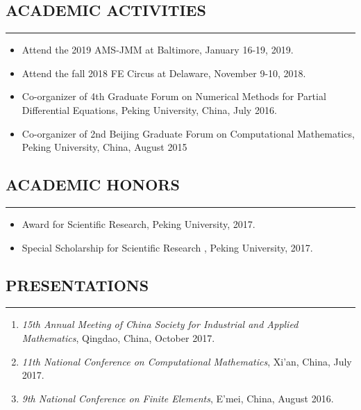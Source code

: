 \documentclass[10pt,a4]{article}
\begin{document}
\begin{small}
\begin{itemize}
\end{itemize}
\subsection*{ACADEMIC ACTIVITIES}
\hrule
\vspace{0.2cm}
\begin{itemize}
	\item Attend the 2019 AMS-JMM at Baltimore, January 16-19, 2019.
	\item Attend the fall 2018 FE Circus at Delaware, November 9-10, 2018.
	\item Co-organizer of 4th Graduate Forum on Numerical Methods for Partial Differential Equations, Peking University, China, July 2016.
	\item Co-organizer of 2nd Beijing Graduate Forum on Computational Mathematics, Peking University, China, August 2015
\end{itemize}
 
\subsection*{ACADEMIC HONORS}
\hrule
\vspace{0.2cm}
\begin{itemize}
	\item Award for Scientific Research, Peking University, 2017.
	\item Special Scholarship for Scientific Research , Peking University, 2017.
\end{itemize}
 
\subsection*{PRESENTATIONS}
\hrule
\vspace{0.2cm}

\begin{enumerate}
    \item 
       {\it 15th Annual Meeting of China Society for Industrial and Applied Mathematics}, Qingdao, China, October 2017. 

    \item  
       {\it 11th National Conference on Computational Mathematics}, Xi'an, China, July 2017. 

    \item 
       {\it 9th National Conference on Finite Elements}, E'mei, China, August 2016. 


\end{enumerate}
\end{small}
\end{document}
